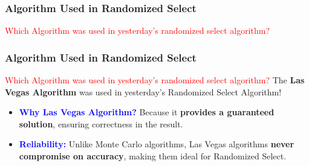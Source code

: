 \begin{frame}
    \frametitle{Algorithm Used in Randomized Select}
    \vspace{0.4cm} %
     \textcolor{red}{Which Algorithm was used in yesterday's randomized select algorithm?}
    
    \vspace{0.5cm} %
\end{frame}


\begin{frame}
    \frametitle{Algorithm Used in Randomized Select}
    \vspace{0.4cm} %

    \begin{block}{\textcolor{red}{Which Algorithm was used in yesterday's randomized select algorithm?}}
        The \textbf{Las Vegas Algorithm} was used in yesterday's Randomized Select Algorithm!
    \end{block}
    \vspace{0.4cm} %

    \begin{itemize}
        \item \textbf{\textcolor{blue}{Why Las Vegas Algorithm?}} 
        Because it \textbf{provides a guaranteed solution}, ensuring correctness in the result.
        \vspace{0.3cm} %
        
        \item \textbf{\textcolor{blue}{Reliability:}} 
        Unlike Monte Carlo algorithms, Las Vegas algorithms \textbf{never compromise on accuracy}, making them ideal for Randomized Select.
    \end{itemize}
    
    \vspace{0.5cm} %
\end{frame}


